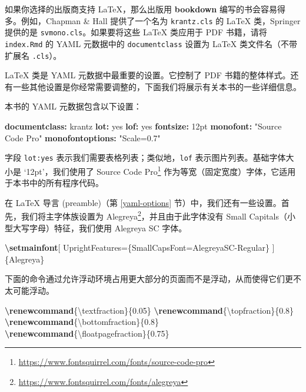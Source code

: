 \documentclass[
  12pt,
]{krantz}
\newenvironment{Shaded}{\begin{snugshade}}{\end{snugshade}}
\newcommand{\AttributeTok}[1]{\textcolor[rgb]{0.13,0.29,0.53}{#1}}
\newcommand{\CharTok}[1]{\textcolor[rgb]{0.31,0.60,0.02}{#1}}
\newcommand{\ExtensionTok}[1]{#1}
\newcommand{\FunctionTok}[1]{\textcolor[rgb]{0.13,0.29,0.53}{\textbf{#1}}}
\newcommand{\KeywordTok}[1]{\textcolor[rgb]{0.13,0.29,0.53}{\textbf{#1}}}
\newcommand{\NormalTok}[1]{#1}
\newcommand{\StringTok}[1]{\textcolor[rgb]{0.31,0.60,0.02}{#1}}
\renewcommand{\href}[2]{#2\footnote{\url{#1}}}
\theoremstyle{definition}
\theoremstyle{definition}
\theoremstyle{definition}
\theoremstyle{definition}
\theoremstyle{remark}
\begin{document}
如果你选择的出版商支持 LaTeX，那么出版用 \textbf{bookdown} 编写的书会容易得多。例如，Chapman \& Hall 提供了一个名为 \texttt{krantz.cls} 的 LaTeX 类，Springer 提供的是 \texttt{svmono.cls}。如果要将这些 LaTeX 类应用于 PDF 书籍，请将 \texttt{index.Rmd} 的 YAML 元数据中的 \texttt{documentclass} 设置为 LaTeX 类文件名（不带扩展名 \texttt{.cls}）。

LaTeX 类是 YAML 元数据中最重要的设置。它控制了 PDF 书籍的整体样式。还有一些其他设置是你经常需要调整的，下面我们将展示有关本书的一些详细信息。

本书的 YAML 元数据包含以下设置：

\begin{Shaded}
\begin{Highlighting}[]
\FunctionTok{documentclass}\KeywordTok{:}\AttributeTok{ krantz}
\FunctionTok{lot}\KeywordTok{:}\AttributeTok{ }\CharTok{yes}
\FunctionTok{lof}\KeywordTok{:}\AttributeTok{ }\CharTok{yes}
\FunctionTok{fontsize}\KeywordTok{:}\AttributeTok{ 12pt}
\FunctionTok{monofont}\KeywordTok{:}\AttributeTok{ }\StringTok{"Source Code Pro"}
\FunctionTok{monofontoptions}\KeywordTok{:}\AttributeTok{ }\StringTok{"Scale=0.7"}
\end{Highlighting}
\end{Shaded}

字段 \texttt{lot:yes} 表示我们需要表格列表；类似地，\texttt{lof} 表示图片列表。基础字体大小是 `12pt'，我们使用了 \href{https://www.fontsquirrel.com/fonts/source-code-pro}{Source Code Pro} 作为等宽（固定宽度）字体，它适用于本书中的所有程序代码。

在 LaTeX 导言 (preamble)（第 \ref{yaml-options} 节）中，我们还有一些设置。首先，我们将主字体族设置为 \href{https://www.fontsquirrel.com/fonts/alegreya}{Alegreya}，并且由于此字体没有 {Small Capitals}（小型大写字母）特征，我们使用 Alegreya SC 字体。

\begin{Shaded}
\begin{Highlighting}[]
\FunctionTok{\textbackslash{}setmainfont}\NormalTok{[}
\NormalTok{  UprightFeatures=\{SmallCapsFont=AlegreyaSC{-}Regular\}}
\NormalTok{]\{Alegreya\}}
\end{Highlighting}
\end{Shaded}

下面的命令通过允许浮动环境占用更大部分的页面而不是浮动，从而使得它们更不太可能浮动。

\begin{Shaded}
\begin{Highlighting}[]
\FunctionTok{\textbackslash{}renewcommand}\NormalTok{\{}\ExtensionTok{\textbackslash{}textfraction}\NormalTok{\}\{0.05\}}
\FunctionTok{\textbackslash{}renewcommand}\NormalTok{\{}\ExtensionTok{\textbackslash{}topfraction}\NormalTok{\}\{0.8\}}
\FunctionTok{\textbackslash{}renewcommand}\NormalTok{\{}\ExtensionTok{\textbackslash{}bottomfraction}\NormalTok{\}\{0.8\}}
\FunctionTok{\textbackslash{}renewcommand}\NormalTok{\{}\ExtensionTok{\textbackslash{}floatpagefraction}\NormalTok{\}\{0.75\}}
\end{Highlighting}
\end{Shaded}
\end{document}
